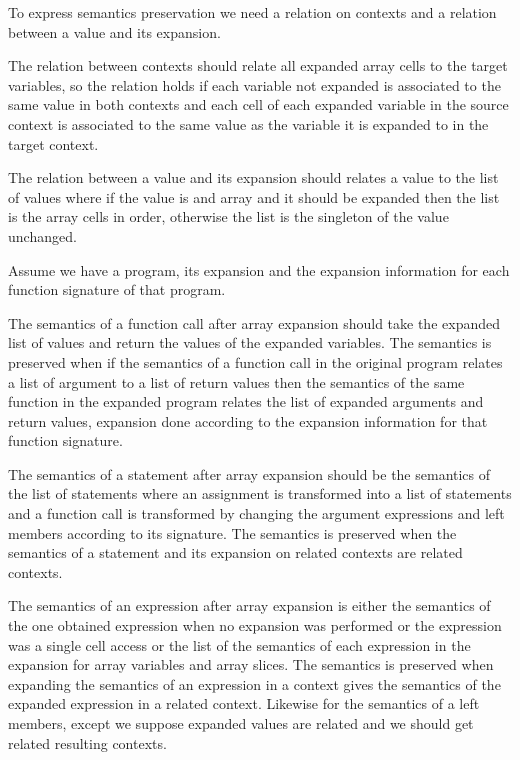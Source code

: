 \documentclass{article}
\begin{document}
To express semantics preservation we need a relation on contexts and a relation
between a value and its expansion.

The relation between contexts should relate all expanded array cells to the
target variables, so the relation holds if each variable not expanded is
associated to the same value in both contexts and each cell of each expanded
variable in the source context is associated to the same value as the variable
it is expanded to in the target context.

The relation between a value and its expansion should relates a value to the
list of values where if the value is and array and it should be expanded then
the list is the array cells in order, otherwise the list is the singleton of the
value unchanged.

\medskip

Assume we have a program, its expansion and the expansion information for each
function signature of that program.

The semantics of a function call after array expansion should take the expanded
list of values and return the values of the expanded variables. The semantics is
preserved when if the semantics of a function call in the original program
relates a list of argument to a list of return values then the semantics of the
same function in the expanded program relates the list of expanded arguments and
return values, expansion done according to the expansion information for that
function signature.

The semantics of a statement after array expansion should be the semantics of
the list of statements where an assignment is transformed into a list of
statements and a function call is transformed by changing the argument
expressions and left members according to its signature. The semantics is
preserved when the semantics of a statement and its expansion on related
contexts are related contexts.

\smallskip

The semantics of an expression after array expansion is either the semantics of
the one obtained expression when no expansion was performed or the expression
was a single cell access or the list of the semantics of each expression in the
expansion for array variables and array slices. The semantics is preserved when
expanding the semantics of an expression in a context gives the semantics of
the expanded expression in a related context. Likewise for the semantics of a
left members, except we suppose expanded values are related and we should get
related resulting contexts.
\end{document}
